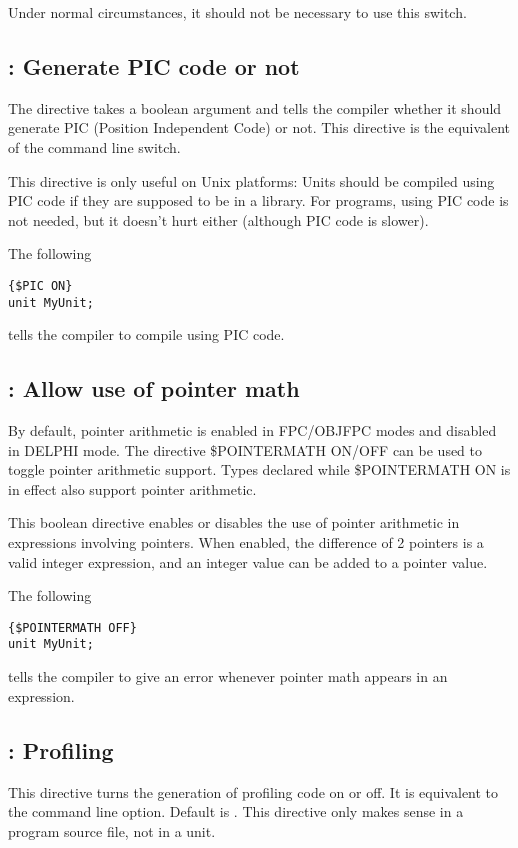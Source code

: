 Under normal circumstances, it should not be necessary to use this
switch.

\subsection{ : Generate PIC code or not}
\label{se:Pic}
The  directive takes a boolean argument and tells the
compiler whether it should generate PIC (Position Independent Code) or not.
This directive is the equivalent of the  command line switch.


This directive is only useful on Unix platforms: Units should be compiled 
using PIC code if they are supposed to be in a library. For programs, using
PIC code is not needed, but it doesn't hurt either (although PIC code is
slower).

The following 
\begin{verbatim}
{$PIC ON}
unit MyUnit;
\end{verbatim}
tells the compiler to compile  using PIC code.

\subsection{ : Allow use of pointer math}

By default, pointer arithmetic is enabled in FPC/OBJFPC modes and disabled in DELPHI mode. 
The directive {\$POINTERMATH ON/OFF} can be used to toggle pointer arithmetic support. 
Types declared while {\$POINTERMATH ON} is in effect also support pointer arithmetic. 

This boolean directive enables or disables the use of pointer arithmetic in
expressions involving pointers. 
When enabled, the difference of 2 pointers is a valid integer expression, and an integer value 
can be added to a pointer value.

The following 
\begin{verbatim}
{$POINTERMATH OFF}
unit MyUnit;
\end{verbatim}
tells the compiler to give an error whenever pointer math appears in an expression.

\subsection{ : Profiling}

This directive turns the generation of profiling code on or off. 
It is equivalent to the  command line option. 
Default is . 
This directive only makes sense in a program source file, not in a unit.




